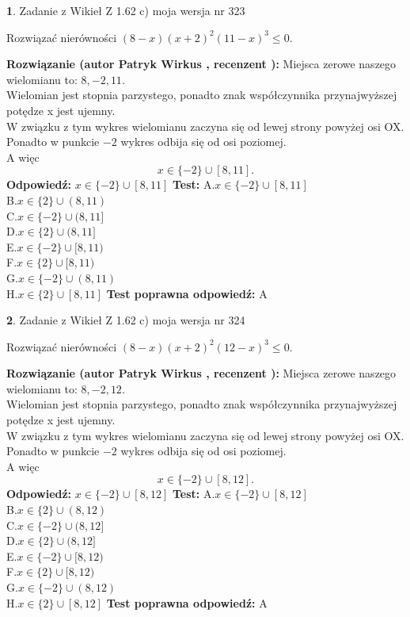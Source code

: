 \documentclass[12pt, a4paper]{article}
\theoremstyle{definition} %
\newtheorem{zad}{}
\newcommand{\zadStart}[1]{\begin{zad}#1\newline}
\newcommand{\zadStop}{\end{zad}}
\newcommand{\rozwStart}[2]{\noindent \textbf{Rozwiązanie (autor #1 , recenzent #2): }\newline}
\newcommand{\rozwStop}{\newline}
\newcommand{\odpStart}{\noindent \textbf{Odpowiedź:}\newline}
\newcommand{\odpStop}{\newline}
\newcommand{\testStart}{\noindent \textbf{Test:}\newline}
\newcommand{\testStop}{\newline}
\newcommand{\kluczStart}{\noindent \textbf{Test poprawna odpowiedź:}\newline}
\newcommand{\kluczStop}{\newline}
\begin{document}
\zadStart{Zadanie z Wikieł Z 1.62 c) moja wersja nr 323}

Rozwiązać nierówności $(8-x)(x+2)^{2}(11-x)^{3}\le0$.
\zadStop
\rozwStart{Patryk Wirkus}{}
Miejsca zerowe naszego wielomianu to: $8, -2, 11$.\\
Wielomian jest stopnia parzystego, ponadto znak współczynnika przy\linebreak najwyższej potędze x jest ujemny.\\ W związku z tym wykres wielomianu zaczyna się od lewej strony powyżej osi OX.\\
Ponadto w punkcie $-2$ wykres odbija się od osi poziomej.\\
A więc $$x \in \{-2\} \cup [8,11].$$
\rozwStop
\odpStart
$x \in \{-2\} \cup [8,11]$
\odpStop
\testStart
A.$x \in \{-2\} \cup [8,11]$\\
B.$x \in \{2\} \cup (8,11)$\\
C.$x \in \{-2\} \cup (8,11]$\\
D.$x \in \{2\} \cup (8,11]$\\
E.$x \in \{-2\} \cup [8,11)$\\
F.$x \in \{2\} \cup [8,11)$\\
G.$x \in \{-2\} \cup (8,11)$\\
H.$x \in \{2\} \cup [8,11]$
\testStop
\kluczStart
A
\kluczStop



\zadStart{Zadanie z Wikieł Z 1.62 c) moja wersja nr 324}

Rozwiązać nierówności $(8-x)(x+2)^{2}(12-x)^{3}\le0$.
\zadStop
\rozwStart{Patryk Wirkus}{}
Miejsca zerowe naszego wielomianu to: $8, -2, 12$.\\
Wielomian jest stopnia parzystego, ponadto znak współczynnika przy\linebreak najwyższej potędze x jest ujemny.\\ W związku z tym wykres wielomianu zaczyna się od lewej strony powyżej osi OX.\\
Ponadto w punkcie $-2$ wykres odbija się od osi poziomej.\\
A więc $$x \in \{-2\} \cup [8,12].$$
\rozwStop
\odpStart
$x \in \{-2\} \cup [8,12]$
\odpStop
\testStart
A.$x \in \{-2\} \cup [8,12]$\\
B.$x \in \{2\} \cup (8,12)$\\
C.$x \in \{-2\} \cup (8,12]$\\
D.$x \in \{2\} \cup (8,12]$\\
E.$x \in \{-2\} \cup [8,12)$\\
F.$x \in \{2\} \cup [8,12)$\\
G.$x \in \{-2\} \cup (8,12)$\\
H.$x \in \{2\} \cup [8,12]$
\testStop
\kluczStart
A
\kluczStop
\end{document}
